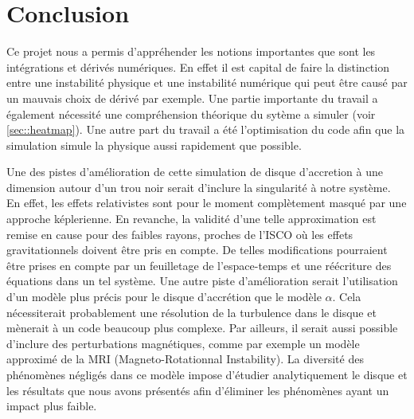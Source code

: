 \section*{Conclusion}

Ce projet nous a permis d'appréhender les notions importantes que sont les intégrations et dérivés numériques. En effet il est capital de faire la distinction entre une instabilité physique et une instabilité numérique qui peut être causé par un mauvais choix de dérivé par exemple. Une partie importante du travail a également nécessité une compréhension théorique du sytème a simuler (voir \ref{sec::heatmap}). Une autre part du travail a été l'optimisation du code afin que la simulation simule la physique aussi rapidement que possible.

Une des pistes d'amélioration de cette simulation de disque d'accretion à une dimension autour d'un trou noir serait d'inclure la singularité à notre système. En effet, les effets relativistes sont pour le moment complètement masqué par une approche képlerienne. En revanche, la validité d'une telle approximation est remise en cause pour des faibles rayons, proches de l'ISCO où les effets gravitationnels doivent être pris en compte. De telles modifications pourraient être prises en compte par un feuilletage de l'espace-temps et une réécriture des équations dans un tel système. Une autre piste d'amélioration serait l'utilisation d'un modèle plus précis pour le disque d'accrétion que le modèle $\alpha$. Cela nécessiterait probablement une résolution de la turbulence dans le disque et mènerait à un code beaucoup plus complexe. Par ailleurs, il serait aussi possible d'inclure des perturbations magnétiques, comme par exemple un modèle approximé de la MRI (Magneto-Rotationnal Instability). La diversité des phénomènes négligés dans ce modèle impose d'étudier analytiquement le disque et les résultats que nous avons présentés afin d'éliminer les phénomènes ayant un impact plus faible. 
